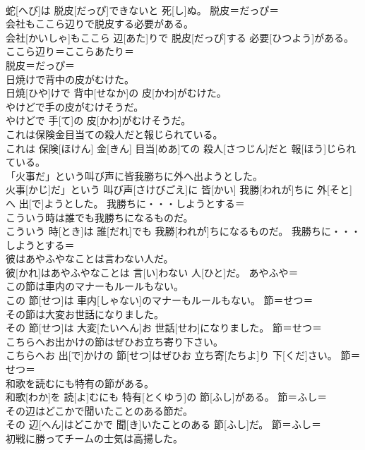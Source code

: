 \documentclass[8pt]{extreport}
\begin{document}
\begin{CJK}{UTF8}{min}
\\	蛇[へび]は 脱皮[だっぴ]できないと 死[し]ぬ。	脱皮＝だっぴ＝ 
\\	会社もここら辺りで脱皮する必要がある。	
\\	会社[かいしゃ]もここら 辺[あた]りで 脱皮[だっぴ]する 必要[ひつよう]がある。	ここら辺り＝ここらあたり＝ 
\\	脱皮＝だっぴ＝ 
\\	日焼けで背中の皮がむけた。	
\\	日焼[ひや]けで 背中[せなか]の 皮[かわ]がむけた。	
\\	やけどで手の皮がむけそうだ。	
\\	やけどで 手[て]の 皮[かわ]がむけそうだ。	
\\	これは保険金目当ての殺人だと報じられている。	
\\	これは 保険[ほけん] 金[きん] 目当[めあ]ての 殺人[さつじん]だと 報[ほう]じられている。	
\\	「火事だ」という叫び声に皆我勝ちに外へ出ようとした。	
\\	火事[かじ]だ」という 叫び声[さけびごえ]に 皆[かい] 我勝[われが]ちに 外[そと]へ 出[で]ようとした。	我勝ちに・・・しようとする＝ 
\\	こういう時は誰でも我勝ちになるものだ。	
\\	こういう 時[とき]は 誰[だれ]でも 我勝[われが]ちになるものだ。	我勝ちに・・・しようとする＝ 
\\	彼はあやふやなことは言わない人だ。	
\\	彼[かれ]はあやふやなことは 言[い]わない 人[ひと]だ。	あやふや＝ 
\\	この節は車内のマナーもルールもない。	
\\	この 節[せつ]は 車内[しゃない]のマナーもルールもない。	節＝せつ＝ 
\\	その節は大変お世話になりました。	
\\	その 節[せつ]は 大変[たいへん]お 世話[せわ]になりました。	節＝せつ＝ 
\\	こちらへお出かけの節はぜひお立ち寄り下さい。	
\\	こちらへお 出[で]かけの 節[せつ]はぜひお 立ち寄[たちよ]り 下[くだ]さい。	節＝せつ＝ 
\\	和歌を読むにも特有の節がある。	
\\	和歌[わか]を 読[よ]むにも 特有[とくゆう]の 節[ふし]がある。	節＝ふし＝ 
\\	その辺はどこかで聞いたことのある節だ。	
\\	その 辺[へん]はどこかで 聞[き]いたことのある 節[ふし]だ。	節＝ふし＝ 
\\	初戦に勝ってチームの士気は高揚した。	

\end{CJK}
\end{document}
